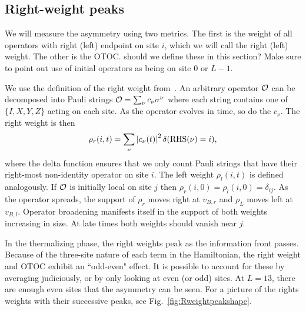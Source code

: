 \documentclass[aps,prx,reprint,superscriptaddress, longbibliography]{revtex4-1}
\newcommand{\charlie}[1]{ {\color{Magenta} {{#1}}}}
\begin{document}
\subsection{Right-weight peaks}

We will measure the asymmetry using two metrics. The first is the weight of all operators with right (left) endpoint on site $i$, which we will call the right (left) weight. The other is the OTOC. \charlie{should we define these in this section?} \charlie{Make sure to point out use of initial operators as being on site 0 or $L-1$}.

We use the definition of the right weight from~\cite{KeyserlingkHydro2017}. An arbitrary operator $\cal O$ can be decomposed into Pauli strings ${\cal O} = \sum_\nu c_\nu \sigma^\nu$ where each string contains one of $\{I, X, Y, Z\}$ acting on each site. As the operator evolves in time, so do the $c_\nu$. The right weight is then
\begin{align}
\rho_r(i,t) = \sum_\nu\left| c_\nu(t)\right|^2\delta(\text{RHS}(\nu) = i),
\end{align}
where the delta function ensures that we only count Pauli strings that have their right-most non-identity operator on site $i$. The left weight $\rho_l(i,t)$ is defined analogously.  If $\cal O$ is initially local on site $j$ then $\rho_r(i,0) = \rho_l(i,0) = \delta_{ij}$. As the operator spreads, the support of $\rho_r$ moves right at $v_{B,r}$ and $\rho_L$ moves left at $v_{B,l}$. Operator broadening manifests itself in the support of both weights increasing in size. At late times both weights should vanish near $j$.

In the thermalizing phase, the right weights peak as the information front passes. Because of the three-site nature of each term in the Hamiltonian, the right weight and OTOC exhibit an ``odd-even" effect. It is possible to account for these by averaging judiciously, or by only looking at even (or odd) sites. At $L=13$, there are enough even sites that the asymmetry can be seen. For a picture of the rights weights with their successive peaks, see Fig.~\ref{fig:Rweightpeakshape}. 
\end{document}
